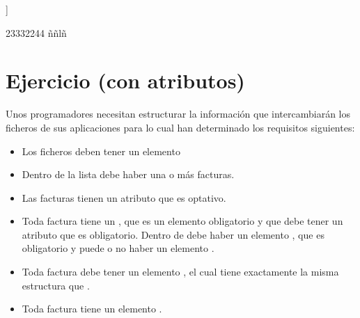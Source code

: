 \documentclass[letterpaper,10pt,spanish]{sphinxmanual}
\begin{document}
\begin{sphinxVerbatim}[commandchars=\\\{\}]

\PYG{c+cp}{\PYGZlt{}!DOCTYPE listapedidos [}
]\PYGZgt{}

                23332244
                ññlñ
\end{sphinxVerbatim}


\section{Ejercicio (con atributos)}
\label{\detokenize{tema5:ejercicio-con-atributos}}
Unos programadores necesitan estructurar la información que intercambiarán los ficheros de sus aplicaciones para lo cual han determinado los requisitos siguientes:
\begin{itemize}
\item {} 
Los ficheros deben tener un elemento 

\item {} 
Dentro de la lista debe haber una o más facturas.

\item {} 
Las facturas tienen un atributo  que es optativo.

\item {} 
Toda factura tiene un , que es un elemento obligatorio y que debe tener un atributo  que es obligatorio. Dentro de  debe haber un elemento , que es obligatorio y puede o no haber un elemento .

\item {} 
Toda factura debe tener un elemento , el cual tiene exactamente la misma estructura que .

\item {} 
Toda factura tiene un elemento .

\end{itemize}
\end{document}
